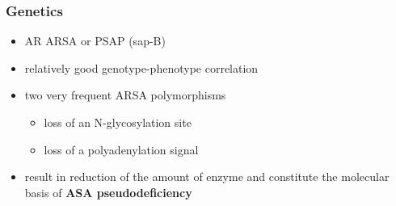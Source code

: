 \documentclass[12pt]{scrartcl}
\begin{document}
\subsubsection{Genetics}
\label{sec:org1f2c365}
\begin{itemize}
\item AR ARSA or PSAP (sap-B)
\item relatively good genotype-phenotype correlation
\item two very frequent ARSA polymorphisms 
\begin{itemize}
\item loss of an N-glycosylation site
\item loss of a polyadenylation signal
\end{itemize}
\item result in reduction of the amount of enzyme and constitute the
molecular basis of \textbf{ASA pseudodeficiency}
\end{itemize}
\end{document}
